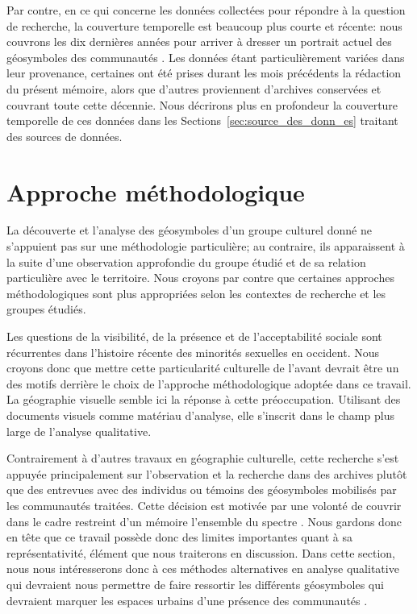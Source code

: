 Par contre, en ce qui concerne les données collectées pour répondre à la question de recherche, la couverture temporelle est beaucoup plus courte et récente: nous couvrons les dix dernières années pour arriver à dresser un portrait actuel des géosymboles des communautés \lgbt{}. 
Les données étant particulièrement variées dans leur provenance, certaines ont été prises durant les mois précédents la rédaction du présent mémoire, alors que d'autres proviennent d'archives conservées et couvrant toute cette décennie. 
Nous décrirons plus en profondeur la couverture temporelle de ces données dans les Sections~\ref{sec:source_des_donn_es} traitant des sources de données.

\section{Approche méthodologique}
\label{sec:approche_m_thodologique}
La découverte et l'analyse des géosymboles d'un groupe culturel donné ne s'appuient pas sur une méthodologie particulière; au contraire, ils apparaissent à la suite d'une observation approfondie du groupe étudié et de sa relation particulière avec le territoire. 
Nous croyons par contre que certaines approches méthodologiques sont plus appropriées selon les contextes de recherche et les groupes étudiés.

Les questions de la visibilité, de la présence et de l'acceptabilité sociale sont récurrentes dans l'histoire récente des minorités sexuelles en occident. 
Nous croyons donc que mettre cette particularité culturelle de l'avant devrait être un des motifs derrière le choix de l'approche méthodologique adoptée dans ce travail. 
La géographie visuelle semble ici la réponse à cette préoccupation. 
Utilisant des documents visuels comme matériau d'analyse, elle s'inscrit dans le champ plus large de l'analyse qualitative.

Contrairement à d'autres travaux en géographie culturelle, cette recherche s'est appuyée principalement sur l'observation et la recherche dans des archives plutôt que des entrevues avec des individus \lgbt{} ou témoins des géosymboles mobilisés par les communautés traitées. 
Cette décision est motivée par une volonté de couvrir dans le cadre restreint d'un mémoire l'ensemble du spectre \lgbt{}.
Nous gardons donc en tête que ce travail possède donc des limites importantes quant à sa représentativité, élément que nous traiterons en discussion.
Dans cette section, nous nous intéresserons donc à ces méthodes alternatives en analyse qualitative qui devraient nous permettre de faire ressortir les différents géosymboles qui devraient marquer les espaces urbains d'une présence des communautés \lgbt{}.

